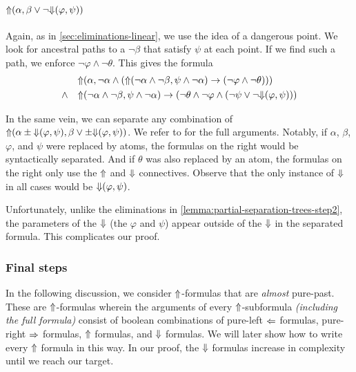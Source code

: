 \documentclass[a4paper,UKenglish,cleveref, autoref, thm-restate, numberwithinsect]{lipics-v2021}
\def\Larrow{\ensuremath\mathord{\Leftarrow}}
\def\Rarrow{\ensuremath\mathord{\Rightarrow}}
\def\Uarrow{\ensuremath\mathord{\Uparrow}}
\def\Darrow{\ensuremath\mathord{\Downarrow}}
\begin{document}
\paragraph*{$\Uarrow(\alpha, \beta \lor \lnot \Darrow(\varphi, \psi))$}

Again, as in \cref{sec:eliminations-linear}, we use the idea of a dangerous point. We look for ancestral paths to a $\lnot \beta$ that satisfy $\psi$ at each point. If we find such a path, we enforce $\lnot \varphi \land \lnot \theta$. This gives the formula
\begin{equation*}
    \begin{aligned}
        &\Uarrow(\alpha, \lnot \alpha \land (\Uarrow(\lnot \alpha \land \lnot \beta, \psi \land \lnot \alpha) \to (\lnot \varphi \land \lnot \theta)))\\
        \land \quad &\Uarrow(\lnot \alpha \land \lnot \beta, \psi \land \lnot \alpha) \to (\lnot \theta \land \lnot \varphi \land (\lnot \psi \lor \lnot \Darrow(\varphi, \psi)))
    \end{aligned}
\end{equation*}

In the same vein, we can separate any combination of $\Uarrow(\alpha \pm \Darrow(\varphi, \psi), \beta \lor \pm \Darrow(\varphi, \psi))$. We refer to \cite{xpathComplete} for the full arguments. Notably, if $\alpha$, $\beta$, $\varphi$, and $\psi$ were replaced by atoms, the formulas on the right would be syntactically separated. And if $\theta$ was also replaced by an atom, the formulas on the right only use the $\Uarrow$ and $\Darrow$ connectives. Observe that the only instance of $\Darrow$ in all cases would be $\Darrow(\varphi, \psi)$.

Unfortunately, unlike the eliminations in \cref{lemma:partial-separation-trees-step2}, the parameters of the $\Darrow$ (the $\varphi$ and $\psi$) appear outside of the $\Darrow$ in the separated formula. This complicates our proof.


\subsubsection{Final steps}

In the following discussion, we consider $\Uarrow$-formulas that are \textit{almost} pure-past. These are $\Uarrow$-formulas wherein the arguments of every $\Uarrow$-subformula \textit{(including the full formula)} consist of boolean combinations of pure-left $\Larrow$ formulas, pure-right $\Rarrow$ formulas, $\Uarrow$ formulas, and $\Darrow$ formulas. We will later show how to write every $\Uarrow$ formula in this way. In our proof, the $\Darrow$ formulas increase in complexity until we reach our target.
\end{document}
